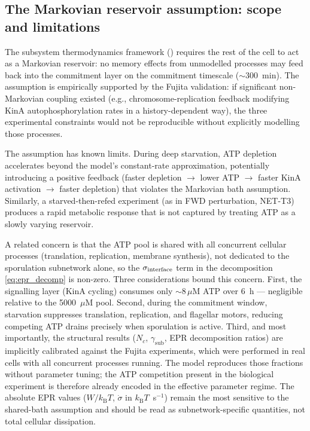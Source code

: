 \documentclass[11pt,a4paper]{article}
\newcommand{\kB}{k_{\mathrm{B}}}
\newcommand{\gsub}{\gamma_{\mathrm{sub}}}
\begin{document}
\subsection{The Markovian reservoir assumption: scope and limitations}

The subsystem thermodynamics framework () requires the
rest of the cell to act as a Markovian reservoir: no memory effects from
unmodelled processes may feed back into the commitment layer on the
commitment timescale ($\sim 300$~min).
The assumption is empirically supported by the Fujita validation:
if significant non-Markovian coupling existed (e.g., chromosome-replication
feedback modifying KinA autophosphorylation rates in a history-dependent
way), the three experimental constraints would not be reproducible
without explicitly modelling those processes.

The assumption has known limits.
During deep starvation, ATP depletion accelerates beyond the model's
constant-rate approximation, potentially introducing a positive feedback
(faster depletion $\to$ lower ATP $\to$ faster KinA activation $\to$
faster depletion) that violates the Markovian bath assumption.
Similarly, a starved-then-refed experiment (as in FWD perturbation, NET-T3)
produces a rapid metabolic response that is not captured by treating ATP
as a slowly varying reservoir.

A related concern is that the ATP pool is shared with all concurrent
cellular processes (translation, replication, membrane synthesis), not
dedicated to the sporulation subnetwork alone, so the $\sigma_{\rm interface}$
term in the decomposition \cref{eq:epr_decomp} is non-zero.
Three considerations bound this concern.
First, the signalling layer (KinA cycling) consumes only $\sim 8\,\mu$M ATP
over 6~h --- negligible relative to the 5000~$\mu$M pool.
Second, during the commitment window, starvation suppresses translation,
replication, and flagellar motors, reducing competing ATP drains
precisely when sporulation is active.
Third, and most importantly, the structural results ($N_c$, $\gsub$, EPR
decomposition ratios) are implicitly calibrated against the Fujita
experiments, which were performed in real cells with all concurrent
processes running.
The model reproduces those fractions without parameter tuning; the ATP
competition present in the biological experiment is therefore already
encoded in the effective parameter regime.
The absolute EPR values ($W/\kB T$, $\dot\sigma$ in $\kB T$~s$^{-1}$)
remain the most sensitive to the shared-bath assumption and should be
read as subnetwork-specific quantities, not total cellular dissipation.
\end{document}
